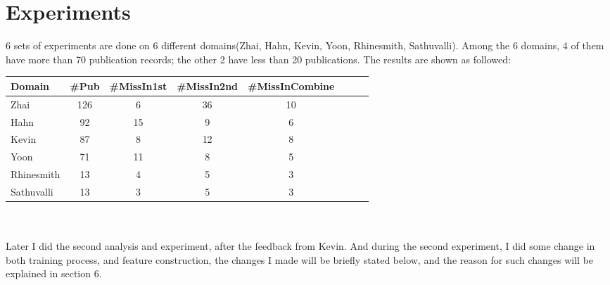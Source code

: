 \documentclass[11pt]{article}
\begin{document}
%	     
%     


\section{Experiments}

6 sets of experiments are done on 6 different domains(Zhai, Hahn, Kevin, Yoon, Rhinesmith, Sathuvalli). Among the 6 domains, 4 of them have more than 70 publication records; the other 2 have less than 20 publications. The results are shown as followed:\\ 

\begin{tabular}{l*{6}{c}r}
Domain				& \#Pub & \#MissIn1st & \#MissIn2nd & \#MissInCombine\\
\hline
Zhai 				& 126	& 6 		& 36		& 10 \\
Hahn					& 92		& 15 	& 9 		& 6 \\
Kevin				& 87		& 8 		& 12		& 8 \\
Yoon					& 71 	& 11 	& 8 		& 5 \\
Rhinesmith			& 13 	& 4 		& 5 		& 3 \\
Sathuvalli			& 13 	& 3 		& 5 		& 3 \\
\end{tabular}\\\\


Later I did the second analysis and experiment, after the feedback from Kevin. And during the second experiment, I did some change in both training process, and feature construction, the changes I made will be briefly stated below, and the reason for such changes will be explained in section 6.\\
\end{document}
